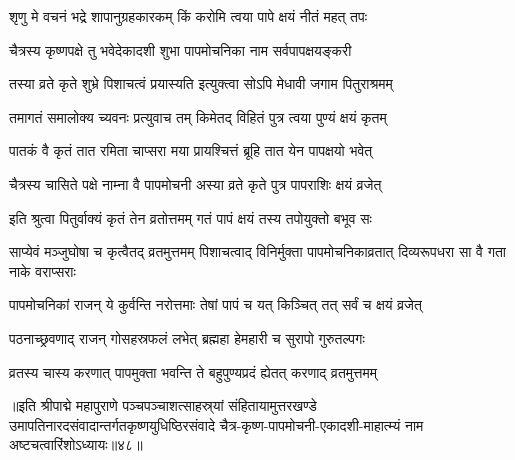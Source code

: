 
\twolineshloka
{शृणु मे वचनं भद्रे शापानुग्रहकारकम्}
{किं करोमि त्वया पापे क्षयं नीतं महत् तपः}%

\twolineshloka
{चैत्रस्य कृष्णपक्षे तु भवेदेकादशी शुभा}
{पापमोचनिका नाम सर्वपापक्षयङ्करी}%

\twolineshloka
{तस्या व्रते कृते शुभ्रे पिशाचत्वं प्रयास्यति}
{इत्युक्त्वा सोऽपि मेधावी जगाम पितुराश्रमम्}%

\twolineshloka
{तमागतं समालोक्य च्यवनः प्रत्युवाच तम्}
{किमेतद् विहितं पुत्र त्वया पुण्यं क्षयं कृतम्}%


\twolineshloka
{पातकं वै कृतं तात रमिता चाप्सरा मया}
{प्रायश्चित्तं ब्रूहि तात येन पापक्षयो भवेत्}%


\twolineshloka
{चैत्रस्य चासिते पक्षे नाम्ना वै पापमोचनी}
{अस्या व्रते कृते पुत्र पापराशिः क्षयं व्रजेत्}%

\twolineshloka
{इति श्रुत्वा पितुर्वाक्यं कृतं तेन व्रतोत्तमम्}
{गतं पापं क्षयं तस्य तपोयुक्तो बभूव सः}%

\threelineshloka
{साप्येवं मञ्जुघोषा च कृत्वैतद् व्रतमुत्तमम्}
{पिशाचत्वाद् विनिर्मुक्ता पापमोचनिकाव्रतात्}
{दिव्यरूपधरा सा वै गता नाके वराप्सराः}%


\twolineshloka
{पापमोचनिकां राजन् ये कुर्वन्ति नरोत्तमाः}
{तेषां पापं च यत् किञ्चित् तत् सर्वं च क्षयं व्रजेत्}%

\twolineshloka
{पठनाच्छ्रवणाद् राजन् गोसहस्रफलं लभेत्}
{ब्रह्महा हेमहारी च सुरापो गुरुतल्पगः}%

\twolineshloka
{व्रतस्य चास्य करणात् पापमुक्ता भवन्ति ते}
{बहुपुण्यप्रदं ह्येतत् करणाद् व्रतमुत्तमम्}%

॥इति श्रीपाद्मे महापुराणे पञ्चपञ्चाशत्साहस्र्यां संहितायामुत्तरखण्डे उमापतिनारदसंवादान्तर्गतकृष्णयुधिष्ठिरसंवादे चैत्र-कृष्ण-पापमोचनी-एकादशी-माहात्म्यं नाम अष्टचत्वारिंशोऽध्यायः॥४८॥

\genMangalaShloka

\hyperref[sec:ekadashi_mahatmyam_padma_puranam]{\closesub}
\clearpage

\label{sec:padma-chaitra-shukla-kamada}

\ganapatyadiDhyanam
\padmaPuranam




